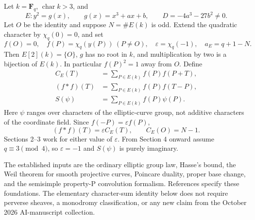 \documentclass[11pt,a4paper]{article}
\numberwithin{equation}{section}
\newcommand{\F}{\mathbf F}
\begin{document}
Let $k=\F_q$, $\operatorname{char}k>3$, and
\begin{equation}\label{eq:curve}
 E:y^2=g(x),\qquad g(x)=x^3+ax+b,\qquad
 D=-4a^3-27b^2\ne0.
\end{equation}
Let $O$ be the identity and suppose $N=\#E(k)$ is odd. Extend the quadratic character by $\chi_q(0)=0$, and set
\begin{equation}\label{eq:definitions}
 f(O)=0,\quad f(P)=\chi_q(y(P))\ (P\ne O),\quad
 \varepsilon=\chi_q(-1),\quad a_E=q+1-N.
\end{equation}
Then $E[2](k)=\{O\}$, $g$ has no root in $k$, and multiplication by two is a bijection of $E(k)$. In particular $f(P)^2=1$ away from $O$. Define
\begin{align}
 C_E(T)&=\sum_{P\in E(k)} f(P)f(P+T),\\
 (f*f)(T)&=\sum_{P\in E(k)} f(P)f(T-P),\\
 S(\psi)&=\sum_{P\in E(k)}f(P)\psi(P).
\end{align}
Here $\psi$ ranges over characters of the elliptic-curve group, not additive characters of the coordinate field. Since $f(-P)=\varepsilon f(P)$,
\begin{equation}\label{eq:convcor}
 (f*f)(T)=\varepsilon C_E(T),\qquad C_E(O)=N-1.
\end{equation}
Sections 2--3 work for either value of $\varepsilon$. From Section 4 onward assume $q\equiv3\pmod4$, so $\varepsilon=-1$ and $S(\psi)$ is purely imaginary.

The established inputs are the ordinary elliptic group law, Hasse's bound, the Weil theorem for smooth projective curves, Poincare duality, proper base change, and the semisimple property-P convolution formalism. References \cite{Sutherland,Milne,Katz,CDRS} specify these foundations. The elementary character-sum identity below does not require perverse sheaves, a monodromy classification, or any new claim from the October 2026 AI-manuscript collection.
\end{document}
